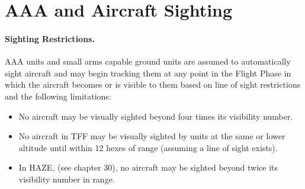 \section{AAA and Aircraft Sighting}

\paragraph{Sighting Restrictions.} AAA units and small arms capable ground units are assumed to automatically sight aircraft and may begin tracking them at any point in the Flight Phase in which the aircraft becomes or is visible to them based on line of sight restrictions and the following limitations:

\begin{itemize}

    \item No aircraft may be visually sighted beyond four times its visibility number.

    \item No aircraft in TFF may be visually sighted by units at the same or lower altitude until within 12 hexes of range (assuming a line of sight exists).

    \item In HAZE, (see chapter 30), no aircraft may be sighted beyond twice its visibility number in range.

\end{itemize}


